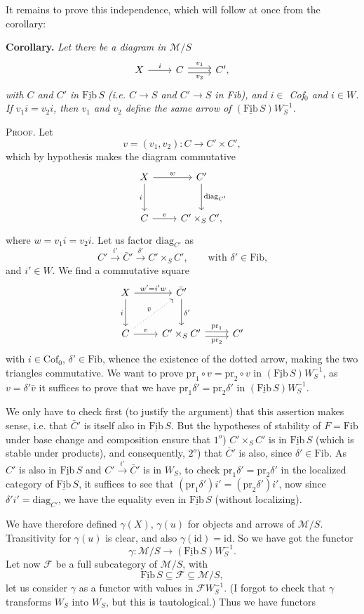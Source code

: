 \documentclass[11pt]{article}
\newcommand{\printedpage}[1]{\marginpar{\footnotesize p.~#1}}
\newcommand{\msp}[1]{\marginpar{\footnotesize [#1]}}
\newcommand{\cM}{\mathcal{M}}
\newcommand{\cF}{\mathcal{F}}
\newcommand{\Fib}{\underline{\mathrm{Fib}}\,}
\begin{document}
It remains to prove this independence,
\msp{page 92}which will follow at once from the corollary:

\textbf{Corollary.} \textit{Let there be a diagram in $\cM/S$}
\[
\begin{tikzcd}
X \arrow[r, "i"] & C \arrow[r, shift left, "v_1"] \arrow[r, shift right, "v_2"'] & C',
\end{tikzcd}
\]
\textit{with $C$ and $C'$ in $\Fib S$ (i.e. $C\longrightarrow S$ and $C'\longrightarrow S$ in Fib), and $i\in$ Cof$_0$ and $i\in W$. If
$v_1i=v_2i$, then $v_1$ and $v_2$ define the same arrow of $(\Fib S)W_S^{-1}$.}

\printedpage{58}
\textsc{Proof}. Let
\[
v=(v_1,v_2):C\longrightarrow C'\times C',
\]
 which by hypothesis makes the diagram commutative
\[
\begin{tikzcd}[row sep=large]
X \arrow[r, "w"] \arrow[d, "i"'] & C' \arrow[d, "\mathrm{diag}_{C'}"] \\
C \arrow[r, "v"] & C'\times_S C',
\end{tikzcd}
\]
where $w=v_1i=v_2i$. Let us factor $\mathrm{diag}_{C'}$ as
\[
C'\xrightarrow{\ i'\ }\bar{C}'\xrightarrow{\ \delta'\ }C'\times_S C', \qquad \text{with $\delta'\in\mathrm{Fib}$,}
\]
and $i'\in W$. We find a commutative square
\[
\begin{tikzcd}[row sep=large]
X \arrow[r, "w'=i'w"] \arrow[d, "i"'] & \bar{C}' \arrow[d, "\delta'"] & \\
C \arrow[r, "v"] \arrow[ur, dotted, "\bar{v}"] & C'\times_S C' \arrow[r, shift left, "\mathrm{pr}_1"] \arrow[r, shift right, "\mathrm{pr}_2"'] & C'
\end{tikzcd}
\]
with $i\in\mathrm{Cof}_0$, $\delta'\in\mathrm{Fib}$, whence the existence of the dotted arrow, making the two triangles
commutative. We want to prove $\mathrm{pr}_1\circ v=\mathrm{pr}_2\circ v$ in $(\Fib S)W_S^{-1}$, as $v=\delta'\bar{v}$ it suffices
to prove that we have $\mathrm{pr}_1\delta'=\mathrm{pr}_2\delta'$ in $(\Fib S)W_S^{-1}$.

\msp{page 93}We only have to check first (to justify the argument) that this assertion makes sense,
i.e. that $\bar{C}'$ is itself also in $\Fib S$. But the hypotheses of stability of $F=\mathrm{Fib}$ under
base change and composition ensure that $1^o$) $C'\times_S C'$ is in $\Fib S$ (which is
stable under products), and consequently, $2^o$) that $\bar{C}'$ is also, since $\delta'\in\mathrm{Fib}$. As $C'$ is
also in $\Fib S$ and $C'\xrightarrow{\ i'\ }\bar{C}'$ is in $W_S$, to check $\mathrm{pr}_1\delta'=\mathrm{pr}_2\delta'$ in the localized category of
$\Fib S$, it suffices to see that $(\mathrm{pr}_1\delta')i'=(\mathrm{pr}_2\delta')i'$, now since $\delta'i'=\mathrm{diag}_{C'}$, we have the equality even
in $\Fib S$ (without localizing).

We have therefore defined $\gamma(X)$, $\gamma(u)$ for objects and arrows of $\cM/S$. Transitivity for $\gamma(u)$ is
clear, and also $\gamma(\mathrm{id})=\mathrm{id}$. So we have got the functor
\[
\gamma:\cM/S\longrightarrow(\Fib S)W_S^{-1}.
\]
Let now $\cF$ be a full subcategory of $\cM/S$, with
\[
\Fib S\subseteq\cF\subseteq\cM/S,
\]
let us consider $\gamma$ as a functor with values in $\cF W_S^{-1}$. (I forgot to check that $\gamma$ transforms
$W_S$ into $W_S$, but this is tautological.) Thus we have functors
\end{document}
